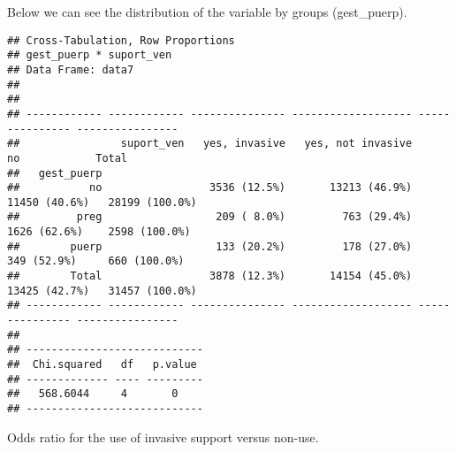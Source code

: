 \documentclass[
]{article}
\newenvironment{Shaded}{\begin{snugshade}}{\end{snugshade}}
\newcommand{\CommentTok}[1]{\textcolor[rgb]{0.56,0.35,0.01}{\textit{#1}}}
\newcommand{\DataTypeTok}[1]{\textcolor[rgb]{0.13,0.29,0.53}{#1}}
\newcommand{\KeywordTok}[1]{\textcolor[rgb]{0.13,0.29,0.53}{\textbf{#1}}}
\newcommand{\NormalTok}[1]{#1}
\newcommand{\OperatorTok}[1]{\textcolor[rgb]{0.81,0.36,0.00}{\textbf{#1}}}
\newcommand{\OtherTok}[1]{\textcolor[rgb]{0.56,0.35,0.01}{#1}}
\newcommand{\StringTok}[1]{\textcolor[rgb]{0.31,0.60,0.02}{#1}}
\begin{document}
Below we can see the distribution of the variable by groups
(gest\_puerp).

\begin{Shaded}
\end{Shaded}

\begin{verbatim}
## Cross-Tabulation, Row Proportions  
## gest_puerp * suport_ven  
## Data Frame: data7  
## 
## 
## ------------ ------------ --------------- ------------------- --------------- ----------------
##                suport_ven   yes, invasive   yes, not invasive              no            Total
##   gest_puerp                                                                                  
##           no                 3536 (12.5%)       13213 (46.9%)   11450 (40.6%)   28199 (100.0%)
##         preg                  209 ( 8.0%)         763 (29.4%)    1626 (62.6%)    2598 (100.0%)
##        puerp                  133 (20.2%)         178 (27.0%)     349 (52.9%)     660 (100.0%)
##        Total                 3878 (12.3%)       14154 (45.0%)   13425 (42.7%)   31457 (100.0%)
## ------------ ------------ --------------- ------------------- --------------- ----------------
## 
## ----------------------------
##  Chi.squared   df   p.value 
## ------------- ---- ---------
##   568.6044     4       0    
## ----------------------------
\end{verbatim}

Odds ratio for the use of invasive support versus non-use.

\begin{Shaded}
\end{Shaded}
\end{document}
